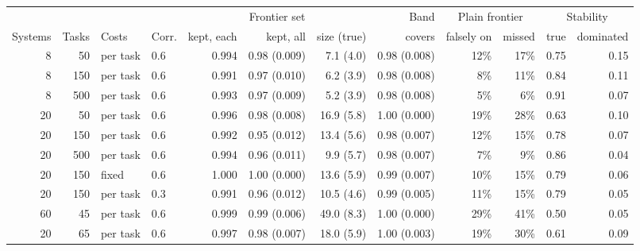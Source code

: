 \begin{tabular}{rrllrrrrrrrr}
\toprule
 & & & & \multicolumn{3}{c}{Frontier set} & Band & \multicolumn{2}{c}{Plain frontier} & \multicolumn{2}{c}{Stability} \\
Systems & Tasks & Costs & Corr. & kept, each & kept, all & size (true) & covers & falsely on & missed & true & dominated \\
\midrule
8 & 50 & per task & 0.6 & 0.994 & 0.98 (0.009) & 7.1 (4.0) & 0.98 (0.008) & 12\% & 17\% & 0.75 & 0.15 \\
8 & 150 & per task & 0.6 & 0.991 & 0.97 (0.010) & 6.2 (3.9) & 0.98 (0.008) & 8\% & 11\% & 0.84 & 0.11 \\
8 & 500 & per task & 0.6 & 0.993 & 0.97 (0.009) & 5.2 (3.9) & 0.98 (0.008) & 5\% & 6\% & 0.91 & 0.07 \\
20 & 50 & per task & 0.6 & 0.996 & 0.98 (0.008) & 16.9 (5.8) & 1.00 (0.000) & 19\% & 28\% & 0.63 & 0.10 \\
20 & 150 & per task & 0.6 & 0.992 & 0.95 (0.012) & 13.4 (5.6) & 0.98 (0.007) & 12\% & 15\% & 0.78 & 0.07 \\
20 & 500 & per task & 0.6 & 0.994 & 0.96 (0.011) & 9.9 (5.7) & 0.98 (0.007) & 7\% & 9\% & 0.86 & 0.04 \\
20 & 150 & fixed & 0.6 & 1.000 & 1.00 (0.000) & 13.6 (5.9) & 0.99 (0.007) & 10\% & 15\% & 0.79 & 0.06 \\
20 & 150 & per task & 0.3 & 0.991 & 0.96 (0.012) & 10.5 (4.6) & 0.99 (0.005) & 11\% & 15\% & 0.79 & 0.05 \\
60 & 45 & per task & 0.6 & 0.999 & 0.99 (0.006) & 49.0 (8.3) & 1.00 (0.000) & 29\% & 41\% & 0.50 & 0.05 \\
20 & 65 & per task & 0.6 & 0.997 & 0.98 (0.007) & 18.0 (5.9) & 1.00 (0.003) & 19\% & 30\% & 0.61 & 0.09 \\
\bottomrule
\end{tabular}
